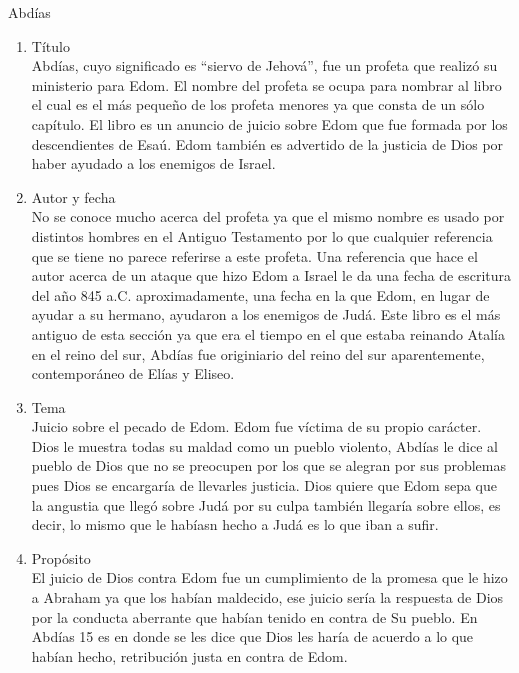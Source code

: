 %
%
\begin{section}{Abdías}
	\begin{enumerate}
		\item Título\\
			Abdías, cuyo significado es ``siervo de Jehová'', fue un profeta que realizó su ministerio para Edom. El nombre del profeta se ocupa para nombrar al libro el cual es el más pequeño de los profeta menores ya que consta de un sólo capítulo. El libro es un anuncio de juicio sobre Edom que fue formada por los descendientes de Esaú. Edom también es advertido de la justicia de Dios por haber ayudado a los enemigos de Israel.
		\item Autor y fecha\\
			No se conoce mucho acerca del profeta ya que el mismo nombre es usado por distintos hombres en el Antiguo Testamento por lo que cualquier referencia que se tiene no parece referirse a este profeta.
			Una referencia que hace el autor acerca de un ataque que hizo Edom a Israel le da una fecha de escritura del año 845 a.C. aproximadamente, una fecha en la que Edom, en lugar de ayudar a su hermano, ayudaron a los enemigos de Judá. Este libro es el más antiguo de esta sección ya que era el tiempo en el que estaba reinando Atalía en el reino del sur, Abdías fue originiario del reino del sur aparentemente, contemporáneo de Elías y Eliseo.
		\item Tema\\
			Juicio sobre el pecado de Edom. Edom fue víctima de su propio carácter. Dios le muestra todas su maldad como un pueblo violento, Abdías le dice al pueblo de Dios que no se preocupen por los que se alegran por sus problemas pues Dios se encargaría de llevarles justicia. Dios quiere que Edom sepa que la angustia que llegó sobre Judá por su culpa también llegaría sobre ellos, es decir, lo mismo que le habíasn hecho a Judá es lo que iban a sufir.
		\item Propósito\\
			El juicio de Dios contra Edom fue un cumplimiento de la promesa que le hizo a Abraham ya que los habían maldecido, ese juicio sería la respuesta de Dios por la conducta aberrante que habían tenido en contra de Su pueblo. En Abdías 15 es en donde se les dice que Dios les haría de acuerdo a lo que habían hecho, retribución justa en contra de Edom. 

\end{enumerate}
\end{section}

